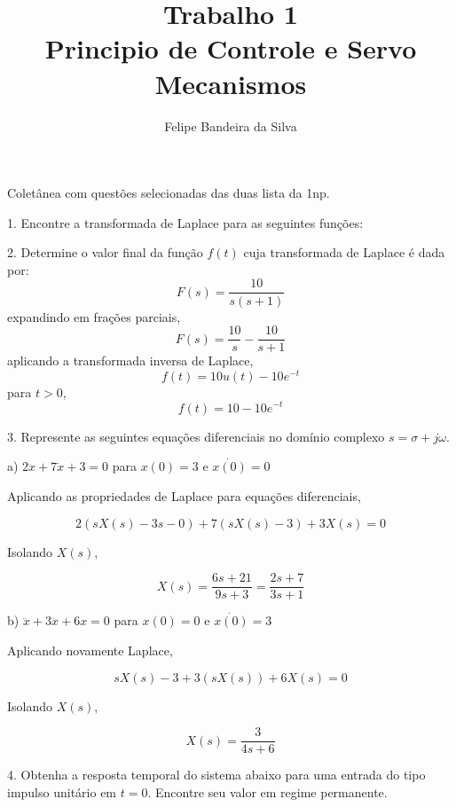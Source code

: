 \documentclass[paper=a4, fontsize=11pt]{article}
\title{Trabalho 1\\Principio de Controle e Servo Mecanismos}
\author{Felipe Bandeira da Silva}
\begin{document}
\maketitle

Coletânea com questões selecionadas das duas lista da 1np.



\newpage

1. Encontre a transformada de Laplace para as seguintes funções:

\newpage

2. Determine o valor final da função $f(t)$ cuja transformada de Laplace é dada por:
$$
F(s) = \frac{10}{s(s+1)}
$$
expandindo em frações parciais,
$$
F(s) = \frac{10}{s} - \frac{10}{s+1}
$$
aplicando a transformada inversa de Laplace,
$$
f(t) = 10 u(t) - 10 e^{-t}
$$
para $t>0$,
$$
f(t) = 10 - 10 e^{-t}
$$

\newpage

3. Represente as seguintes equações diferenciais no domínio complexo $s=\sigma + j \omega$.

a) $2 \ddot{x} + 7 \dot{x} +  3 = 0$ para $x(0)=3$ e $\dot{x(0)}=0$

Aplicando as propriedades de Laplace para equações diferenciais,

$$
2 (s X(s) - 3 s - 0) + 7 (s X(s) - 3) + 3 X(s) = 0
$$

Isolando $X(s)$,

$$
X(s) = \frac{6s + 21}{9 s + 3} = \frac{2 s + 7}{3 s + 1}
$$

b) $\ddot{x} + 3 \ddot{x} + 6 x = 0$ para $x(0) = 0$ e $\dot{x(0)}=3$

Aplicando novamente Laplace,

$$
s X(s) - 3 + 3 (s X(s)) + 6 X(s) = 0
$$

Isolando $X(s)$,

$$
X(s) = \frac{3}{4 s + 6}
$$

\newpage

4. Obtenha a resposta temporal do sistema abaixo para uma entrada do tipo impulso unitário
em $t=0$. Encontre seu valor em regime permanente.
\end{document}
